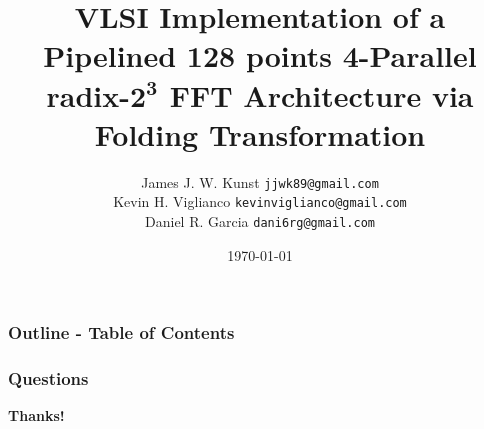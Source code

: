 \documentclass[xcolor=table,ps]{beamer}
\title[FFT Architecture via Folding Transformation]{\textbf{VLSI Implementation of a Pipelined 128 points 4-Parallel radix-$\mathbf{2^3}$ FFT Architecture via Folding Transformation}}
\author{			
			   James J. W. Kunst  {\tt\small jjwk89@gmail.com}\\		
\hspace*{18mm} Kevin H. Viglianco {\tt\small kevinviglianco@gmail.com}\\	 
\hspace*{7.mm} Daniel R. Garcia   {\tt\small dani6rg@gmail.com}\\
}
\date{\today} %
\begin{document}
\begin{frame}
  \titlepage
\end{frame}



\begin{frame} 
  \frametitle{\textbf{Outline - Table of Contents}}
  \tableofcontents
\end{frame}




%
%  
%  


\begin{frame}
  \frametitle{\textbf{Questions}}
   \begin{center}
     {\Huge \textbf{Thanks!}\\}
    \end{center}
\end{frame}
\end{document}
